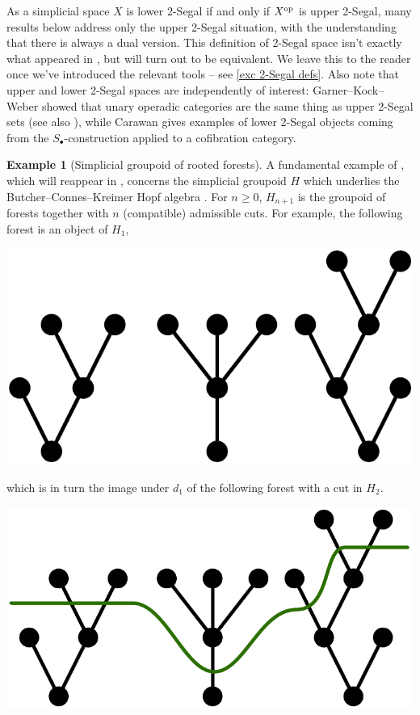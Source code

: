 \documentclass{amsart}
\theoremstyle{definition}
\newtheorem{example}[theorem]{Example}
\theoremstyle{remark}
\newcommand{\op}{\textup{op}}
\begin{document}
As a simplicial space $X$ is lower 2-Segal if and only if $X^\op$ is upper 2-Segal, many results below address only the upper 2-Segal situation, with the understanding that there is always a dual version.
This definition of 2-Segal space isn't exactly what appeared in \cite{Stern:BIRS}, but will turn out to be equivalent.
We leave this to the reader once we've introduced the relevant tools --
see \cref{exc 2-Segal defs}.
Also note that upper and lower 2-Segal spaces are independently of interest: Garner--Kock--Weber \cite{GarnerKockWeber:OCD} showed that unary operadic categories are the same thing as upper 2-Segal sets (see also \cite{Hackney:OC2SS}), while Carawan \cite{Carawan:2SMACWC} gives examples of lower 2-Segal objects coming from the $S_\bullet$-construction applied to a cofibration category.

\begin{example}[Simplicial groupoid of rooted forests]\label{ex forests}
A fundamental example of \cite{GKT1}, which will reappear in \cite{Tonks:BIRS}, concerns the simplicial groupoid $H$ which underlies the Butcher--Connes--Kreimer Hopf algebra \cite{ConnesKreimer:HARNG}.
For $n \geq 0$, $H_{n+1}$ is the groupoid of forests together with $n$ (compatible) admissible cuts.
For example, the following forest is an object of $H_1$,
\begin{center}
\includegraphics[scale=0.2]{forest_no_cut.pdf}
\end{center}
which is in turn the image under $d_1$ of the following forest with a cut in $H_2$.
\begin{center}
\includegraphics[scale=0.2]{forest_with_cut.pdf}

\end{center}
\end{example}
\end{document}

